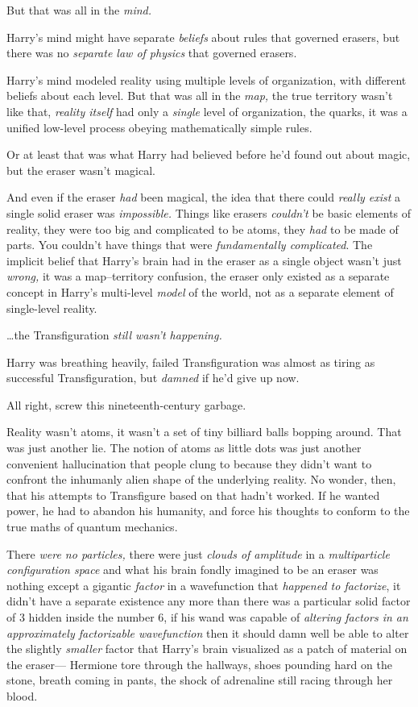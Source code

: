 But that was all in the \emph{mind.}

Harry's mind might have separate \emph{beliefs} about rules that governed
erasers, but there was no \emph{separate law of physics} that governed erasers.

Harry's mind modeled reality using multiple levels of organization, with
different beliefs about each level. But that was all in the \emph{map,} the
true territory wasn't like that, \emph{reality itself} had only a \emph{single}
level of organization, the quarks, it was a unified low-level process obeying
mathematically simple rules.

Or at least that was what Harry had believed before he'd found out about magic,
but the eraser wasn't magical.

And even if the eraser \emph{had} been magical, the idea that there could
\emph{really exist} a single solid eraser was \emph{impossible.} Things like
erasers \emph{couldn't} be basic elements of reality, they were too big and
complicated to be atoms, they \emph{had} to be made of parts. You
couldn't have things that were \emph{fundamentally complicated}. The implicit
belief that Harry's brain had in the eraser as a single object wasn't just
\emph{wrong,} it was a map--territory confusion, the eraser only existed as a
separate concept in Harry's multi-level \emph{model} of the world, not as a
separate element of single-level reality.

{\ldots}the Transfiguration \emph{still wasn't happening.}

Harry was breathing heavily, failed Transfiguration was almost as tiring as
successful Transfiguration, but \emph{damned} if he'd give up now.

All right, screw this nineteenth-century garbage.

Reality wasn't atoms, it wasn't a set of tiny billiard balls bopping around.
That was just another lie. The notion of atoms as little dots was just another
convenient hallucination that people clung to because they didn't want to
confront the inhumanly alien shape of the underlying reality. No wonder, then,
that his attempts to Transfigure based on that hadn't worked. If he wanted
power, he had to abandon his humanity, and force his thoughts to conform to the
true maths of quantum mechanics.

There \emph{were no particles,} there were just \emph{clouds of amplitude} in a
\emph{multiparticle configuration space} and what his brain fondly imagined to
be an eraser was nothing except a gigantic \emph{factor} in a wavefunction that
\emph{happened to factorize}, it didn't have a separate existence any more than
there was a particular solid factor of 3 hidden inside the number 6, if his
wand was capable of \emph{altering factors in an approximately factorizable
wavefunction} then it should damn well be able to alter the slightly
\emph{smaller} factor that Harry's brain visualized as a patch of material on
the eraser---
\later
Hermione tore through the hallways, shoes pounding hard on the stone, breath
coming in pants, the shock of adrenaline still racing through her blood.

